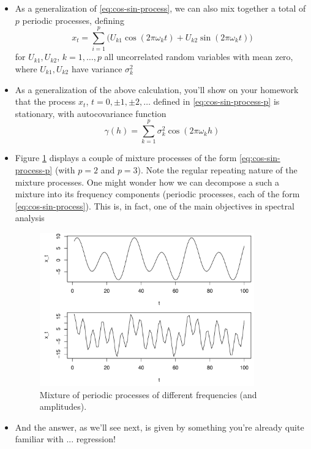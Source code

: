 \documentclass{article}
\begin{document}
\begin{itemize}
\item As a generalization of \eqref{eq:cos-sin-process}, we can also mix
  together a total of $p$ periodic processes, defining
  \begin{equation}
  \label{eq:cos-sin-process-p}
  x_t = \sum_{i=1}^p \Big( U_{k1} \cos(2\pi\omega_k t) + U_{k2}
  \sin(2\pi\omega_k t) \Big) 
  \end{equation}
  for $U_{k1}, U_{k2}$, $k = 1,\dots,p$ all uncorrelated random variables with
  mean zero, where $U_{k1}, U_{k2}$ have variance $\sigma^2_k$

\item As a generalization of the above calculation, you'll show on your homework
  that the process $x_t$, $t = 0, \pm 1, \pm 2, \dots$ defined in
  \eqref{eq:cos-sin-process-p} is stationary, with autocovariance function 
  \[
  \gamma(h) = \sum_{k=1}^p \sigma^2_k \cos(2\pi\omega_k h)
  \]

\item Figure \ref{fig:cos-mixture} displays a couple of mixture processes of the 
  form \eqref{eq:cos-sin-process-p} (with $p=2$ and $p=3$). Note the regular
  repeating nature of the mixture processes. One might wonder how we can
  decompose a such a mixture into its frequency components (periodic processes,
  each of the form \eqref{eq:cos-sin-process}). This is, in fact, one of the
  main objectives in spectral analysis

\begin{figure}[htb]
\centering
\includegraphics[width=0.875\textwidth]{fig/cos-mixture-1.pdf}
\caption{Mixture of periodic processes of different frequencies (and
  amplitudes).}  
\label{fig:cos-mixture}
\end{figure}

\item And the answer, as we'll see next, is given by something you're already
  quite familiar with ... regression! 
\end{itemize}
\end{document}
